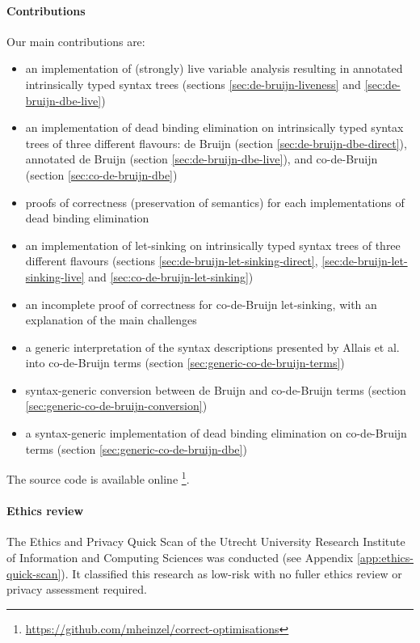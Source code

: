   \paragraph{Contributions}
    Our main contributions are:
    \begin{itemize}
      \item an implementation of (strongly) live variable analysis resulting in annotated intrinsically typed syntax trees
        (sections \ref{sec:de-bruijn-liveness} and \ref{sec:de-bruijn-dbe-live})
      \item an implementation of dead binding elimination on intrinsically typed syntax trees of three different flavours:
        de Bruijn (section \ref{sec:de-bruijn-dbe-direct}),
        annotated de Bruijn (section \ref{sec:de-bruijn-dbe-live}),
        and co-de-Bruijn (section \ref{sec:co-de-bruijn-dbe})
      \item proofs of correctness (preservation of semantics) for each implementations of dead binding elimination
      \item an implementation of let-sinking on intrinsically typed syntax trees of three different flavours
        (sections \ref{sec:de-bruijn-let-sinking-direct}, \ref{sec:de-bruijn-let-sinking-live} and \ref{sec:co-de-bruijn-let-sinking})
      \item an incomplete proof of correctness for co-de-Bruijn let-sinking, with an explanation of the main challenges
      \item a generic interpretation of the syntax descriptions presented by Allais et al.
        \cite{Allais2018UniverseOfSyntaxes} into co-de-Bruijn terms
        (section \ref{sec:generic-co-de-bruijn-terms})
      \item syntax-generic conversion between de Bruijn and co-de-Bruijn terms
        (section \ref{sec:generic-co-de-bruijn-conversion})
      \item a syntax-generic implementation of dead binding elimination on co-de-Bruijn terms
        (section \ref{sec:generic-co-de-bruijn-dbe})
    \end{itemize}
    The source code is available online%
    \footnote{\url{https://github.com/mheinzel/correct-optimisations}}.

  \paragraph{Ethics review}
    The Ethics and Privacy Quick Scan of the Utrecht University Research Institute of Information and Computing Sciences was conducted (see Appendix \ref{app:ethics-quick-scan}).
    It classified this research as low-risk with no fuller ethics review or privacy assessment required.
